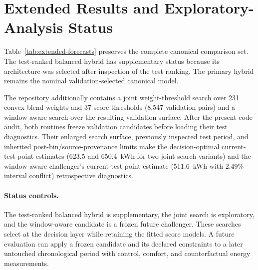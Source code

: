 \section{Extended Results and Exploratory-Analysis Status}

Table~\ref{tab:extended-forecasts} preserves the complete canonical comparison set. The test-ranked balanced hybrid has supplementary status because its architecture was selected after inspection of the test ranking. The primary hybrid remains the nominal validation-selected canonical model.



The repository additionally contains a joint weight-threshold search over 231 convex blend weights and 37 score thresholds (8,547 validation pairs) and a window-aware search over the resulting validation surface. After the present code audit, both routines freeze validation candidates before loading their test diagnostics. Their enlarged search surface, previously inspected test period, and inherited post-bin/source-provenance limits make the decision-optimal current-test point estimates (623.5 and 650.4~kWh for two joint-search variants) and the window-aware challenger's current-test point estimate (511.6~kWh with 2.49\% interval conflict) retrospective diagnostics.

\paragraph{Status controls.} The test-ranked balanced hybrid is supplementary, the joint search is exploratory, and the window-aware candidate is a frozen future challenger. These searches select at the decision layer while retaining the fitted score models. A future evaluation can apply a frozen candidate and its declared constraints to a later untouched chronological period with control, comfort, and counterfactual energy measurements.
